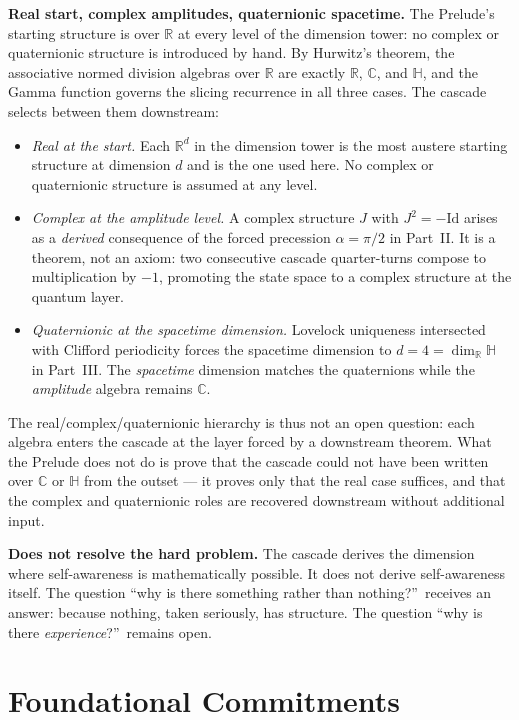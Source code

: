 \documentclass[11pt,a4paper]{article}
\begin{document}
\textbf{Real start, complex amplitudes, quaternionic spacetime.} The
Prelude's starting structure is over $\mathbb{R}$ at every level of
the dimension tower: no complex or quaternionic structure is
introduced by hand. By Hurwitz's theorem, the associative normed
division algebras over $\mathbb{R}$ are exactly $\mathbb{R}$,
$\mathbb{C}$, and $\mathbb{H}$, and the Gamma function governs the
slicing recurrence in all three cases. The cascade selects between
them downstream:
\begin{itemize}
\item \emph{Real at the start.} Each $\mathbb{R}^d$ in the dimension
tower is the most austere starting structure at dimension $d$ and is
the one used here. No complex or quaternionic structure is assumed at
any level.
\item \emph{Complex at the amplitude level.} A complex structure $J$
with $J^2=-\mathrm{Id}$ arises as a \emph{derived} consequence of the
forced precession $\alpha=\pi/2$ in Part~II. It is a theorem, not an
axiom: two consecutive cascade quarter-turns compose to multiplication
by $-1$, promoting the state space to a complex structure at the
quantum layer.
\item \emph{Quaternionic at the spacetime dimension.} Lovelock
uniqueness intersected with Clifford periodicity forces the spacetime
dimension to $d=4=\dim_\mathbb{R}\mathbb{H}$ in Part~III. The
\emph{spacetime} dimension matches the quaternions while the
\emph{amplitude} algebra remains $\mathbb{C}$.
\end{itemize}
The real/complex/quaternionic hierarchy is thus not an open question:
each algebra enters the cascade at the layer forced by a downstream
theorem. What the Prelude does not do is prove that the cascade could
not have been written over $\mathbb{C}$ or $\mathbb{H}$ from the
outset --- it proves only that the real case suffices, and that the
complex and quaternionic roles are recovered downstream without
additional input.

\textbf{Does not resolve the hard problem.} The cascade derives the
dimension where self-awareness is mathematically possible. It does
not derive self-awareness itself. The question ``why is there
something rather than nothing?''\ receives an answer: because
nothing, taken seriously, has structure. The question ``why is there
\emph{experience}?''\ remains open.

\section{Foundational Commitments}
\label{sec:foundational-commitments}
\end{document}

